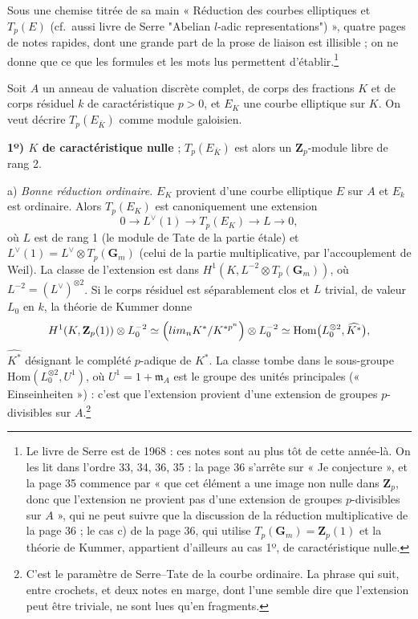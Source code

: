 \documentclass[11pt,a4paper]{article}
\begin{document}
Sous une chemise titrée de sa main « Réduction des courbes elliptiques et
$T_p(E)$ (cf.\ aussi livre de Serre "Abelian $l$-adic representations") »,
quatre pages de notes rapides, dont une grande part de la prose de liaison est
illisible ; on ne donne que ce que les formules et les mots lus
permettent d'établir.\footnote{Le livre de Serre est de 1968 : ces notes sont
au plus tôt de cette année-là. On les lit dans l'ordre 33, 34, 36, 35 : la page
36 s'arrête sur « Je conjecture », et la page 35 commence par « que cet élément
a une image non nulle dans $\mathbf{Z}_p$, donc que l'extension ne provient
pas d'une extension de groupes $p$-divisibles sur $A$ », qui ne peut suivre que
la discussion de la réduction multiplicative de la page 36 ; le cas c) de la
page 36, qui utilise $T_p(\mathbf{G}_m) = \mathbf{Z}_p(1)$ et la théorie de
Kummer, appartient d'ailleurs au cas 1º, de caractéristique nulle.}

Soit $A$ un anneau de valuation discrète complet, de corps des fractions $K$
et de corps résiduel $k$ de caractéristique $p > 0$, et $E_K$ une courbe
elliptique sur $K$. On veut décrire $T_p(E_{\bar K})$ comme module galoisien.

\textbf{1º) $K$ de caractéristique nulle} ; $T_p(E_{\bar K})$ est alors un
$\mathbf{Z}_p$-module libre de rang 2.

a) \emph{Bonne réduction ordinaire.} $E_K$ provient d'une courbe elliptique
$E$ sur $A$ et $E_k$ est ordinaire. Alors $T_p(E_K)$ est canoniquement une
extension
\[
  0 \longrightarrow L^\vee(1) \longrightarrow T_p(E_K) \longrightarrow L
  \longrightarrow 0 ,
\]
où $L$ est de rang 1 (le module de Tate de la partie étale) et
$L^\vee(1) = L^\vee \otimes T_p(\mathbf{G}_m)$ (celui de la partie
multiplicative, par l'accouplement de Weil). La classe de l'extension est dans
$H^1(K, L^{-2} \otimes T_p(\mathbf{G}_m))$, où $L^{-2} = (L^\vee)^{\otimes 2}$.
Si le corps résiduel est séparablement clos et $L$ trivial, de valeur $L_0$ en
$k$, la théorie de Kummer donne
\[
  H^1(K, \mathbf{Z}_p(1)) \otimes L_0^{-2} \simeq
  \Bigl(\varprojlim_n K^*/K^{*p^n}\Bigr) \otimes L_0^{-2}
  \simeq \mathrm{Hom}\bigl(L_0^{\otimes 2}, \widehat{K^*}\bigr) ,
\]
$\widehat{K^*}$ désignant le complété $p$-adique de $K^*$. La classe tombe
dans le sous-groupe $\mathrm{Hom}(L_0^{\otimes 2}, U^1)$, où $U^1 = 1 + \mathfrak{m}_A$
est le groupe des unités principales (« Einseinheiten ») : c'est que
l'extension provient d'une extension de groupes $p$-divisibles sur $A$.\footnote{C'est
le paramètre de Serre--Tate de la courbe ordinaire. La phrase qui suit, entre
crochets, et deux notes en marge, dont l'une semble dire que l'extension peut
être triviale, ne sont lues qu'en fragments.}
\end{document}
